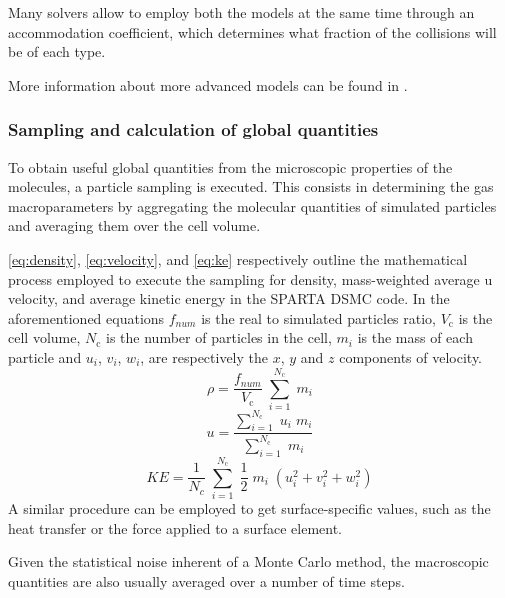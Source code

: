 Many solvers allow to employ both the models at the same time through an accommodation coefficient, which determines what fraction of the collisions will be of each type.

More information about more advanced models can be found in \cite{spartadoc}.

\subsubsection{Sampling and calculation of global quantities}
\label{subsection:sampling}

To obtain useful global quantities from the microscopic properties of the molecules, a particle sampling is executed. This consists in determining the gas macroparameters by aggregating the molecular quantities of simulated particles and averaging them over the cell volume. 

\autoref{eq:density}, \autoref{eq:velocity}, and \autoref{eq:ke} respectively outline the mathematical process employed to execute the sampling for density, mass-weighted average u velocity, and average kinetic energy in the SPARTA DSMC code. In the aforementioned equations $f_{num}$ is the real to simulated particles ratio, $V_{\mathrm{c}}$ is the cell volume, $N_{\mathrm{c}}$ is the number of particles in the cell, $m_i$ is the mass of each particle and $u_i$, $v_i$, $w_i$, are respectively the $x$, $y$ and $z$ components of velocity.
\begin{equation}
    \rho = \frac{f_{num}}{V_{\mathrm{c}}}\; \sum_{i=1}^{N_{\mathrm{c}}}\; m_i
    \label{eq:density}
\end{equation}
\begin{equation}
    u = \frac{\sum_{i=1}^{N_{\mathrm{c}}}\; u_i\; m_i}{\sum_{i=1}^{N_{\mathrm{c}}}\; m_i} 
    \label{eq:velocity}
\end{equation}
\begin{equation}
    KE = \frac{1}{N_c}\; \sum_{i=1}^{N_{\mathrm{c}}}\; \frac{1}{2}\; m_i\; (u_i^2+v_i^2+w_i^2)
    \label{eq:ke}
\end{equation}
A similar procedure can be employed to get surface-specific values, such as the heat transfer or the force applied to a surface element.

Given the statistical noise inherent of a Monte Carlo method, the macroscopic quantities are also usually averaged over a number of time steps.

